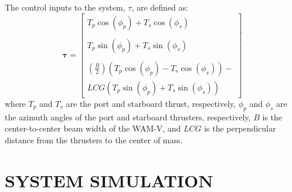 \documentclass[letterpaper, 10 pt, conference]{ieeeconf}  %
\begin{document}
The control inputs to the system, $\tau$, are defined as:
\begin{equation}
\bm{\tau} = \left[
\begin{matrix}
T_{p}\cos\left(\phi_{p}\right) + T_{s}\cos\left(\phi_{s}\right)\\
\\
T_{p}\sin\left(\phi_{p}\right) + T_{s}\sin\left(\phi_{s}\right)\\
\\
\left(\frac{B}{2}\right)\left(T_{p}\cos\left(\phi_{p}\right) - T_{s}\cos\left(\phi_{s}\right)\right) -\\ LCG\left(T_{p}\sin\left(\phi_{p}\right) + T_{s}\sin\left(\phi_{s}\right)\right)
\end{matrix}
\right]
\end{equation}
%
where $T_p$ and $T_s$ are the port and starboard thrust, respectively, $\phi_p$ and $\phi_s$ are the azimuth angles of the port and starboard thrusters, respectively, $B$ is the center-to-center beam width of the WAM-V, and $LCG$ is the perpendicular distance from the thrusters to the center of mass.
%
\section{SYSTEM SIMULATION}
\end{document}
